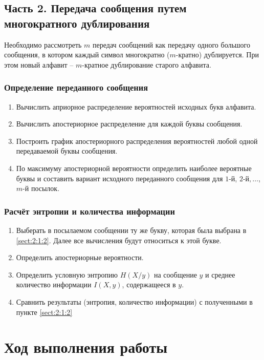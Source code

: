 \subsection{Часть 2. Передача сообщения путем многократного дублирования}

Необходимо рассмотреть $m$ передач сообщений как передачу одного большого сообщения, в котором каждый символ многократно ($m$-кратно) дублируется. При этом новый алфавит – $m$-кратное дублирование старого алфавита.

\subsubsection{Определение переданного сообщения}
\label{sect:2:2:1}
\begin{enumerate}
	\item Вычислить априорное распределение вероятностей исходных букв алфавита.
	\item Вычислить апостериорное распределение для каждой буквы сообщения.
	\item Построить график апостериорного распределения вероятностей любой одной передаваемой буквы сообщения.
	\item По максимуму апостериорной вероятности определить наиболее вероятные буквы и составить вариант исходного переданного сообщения для $1$-й, $2$-й$,\dots$, $m$-й посылок.
\end{enumerate}

\subsubsection{Расчёт энтропии и количества информации}
\label{sect:2:2:2}
\begin{enumerate}
	\item Выберать в посылаемом сообщении ту же букву, которая была выбрана в \ref{sect:2:1:2}. Далее все вычисления будут относиться к этой букве.
	\item Определить апостериорные вероятности.
	\item Определить условную энтропию $H(X/y)$ на сообщение $y$ и среднее количество информации $I(X, y)$, содержащееся в $y$.
	\item Сравнить результаты (энтропия, количество информации) с полученными в пункте \ref{sect:2:1:2}
\end{enumerate}

\section{Ход выполнения работы}

